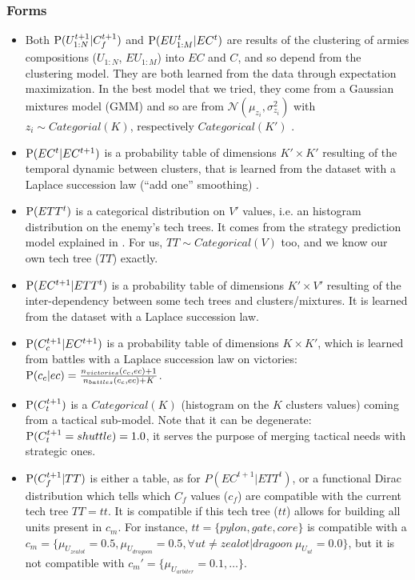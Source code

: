 \subsubsection{Forms}
\begin{itemize}
\item Both $\mathrm{P}(U_{1:N}^{t+1}|C_f^{t+1})$ and $\mathrm{P}(EU_{1:M}^t|EC^t)$ are results of the clustering of armies compositions ($U_{1:N}$, $EU_{1:M}$) into $EC$ and $C$, and so depend from the clustering model. They are both learned from the data through expectation maximization. In the best model that we tried, they come from a Gaussian mixtures model (GMM) and so are from $\mathcal{N}(\mu_{z_i}, \sigma^2_{z_i})$ with $z_i \sim Categorial(K)$, respectively $Categorical(K')$ \cite{reynolds95}. %

\item $\mathrm{P}(EC^t|EC^{t+1})$ is a probability table of dimensions $K' \times K'$ resulting of the temporal dynamic between clusters, that is learned from the dataset with a Laplace succession law (``add one'' smoothing) \cite{Jaynes}.

\item $\mathrm{P}(ETT^t)$ is a categorical distribution on $V'$ values, i.e. an histogram distribution on the enemy's tech trees. It comes from the strategy prediction model explained in \cite{SYNNAEVE:StratPred}. For us, $TT \sim Categorical(V)$ too, and we know our own tech tree ($TT$) exactly.

\item $\mathrm{P}(EC^{t+1}|ETT^t)$ is a probability table of dimensions $K' \times V'$ resulting of the inter-dependency between some tech trees and clusters/mixtures. It is learned from the dataset with a Laplace succession law.

\item $\mathrm{P}(C_c^{t+1}|EC^{t+1})$ is a probability table of dimensions $K \times K'$, which is learned from battles with a Laplace succession law on victories: $\mathrm{P}(c_c|ec) = \frac{n_{victories}(c_c, ec)+1}{n_{battles}(c_c, ec)+K}$.

\item $\mathrm{P}(C_t^{t+1})$ is a $Categorical(K)$ (histogram on the $K$ clusters values) coming from a tactical sub-model. Note that it can be degenerate: $\mathrm{P}(C_t^{t+1}=shuttle)=1.0$, it serves the purpose of merging tactical needs with strategic ones.

\item $\mathrm{P}(C_f^{t+1}|TT)$ is either a table, as for $P(EC^{t+1}|ETT^t)$, or a functional Dirac distribution which tells which $C_f$ values ($c_f$) are compatible with the current tech tree $TT=tt$. It is compatible if this tech tree ($tt$) allows for building all units present in $c_m$. For instance, $tt=\{pylon, gate, core\}$ is compatible with a $c_m=\{\mu_{U_{zealot}}=0.5, \mu_{U_{dragoon}}=0.5, \forall ut \neq zealot|dragoon\ \mu_{U_{ut}}=0.0\}$, but it is not compatible with $c_m'=\{\mu_{U_{arbiter}}=0.1, \dots\}$.


\end{itemize}
